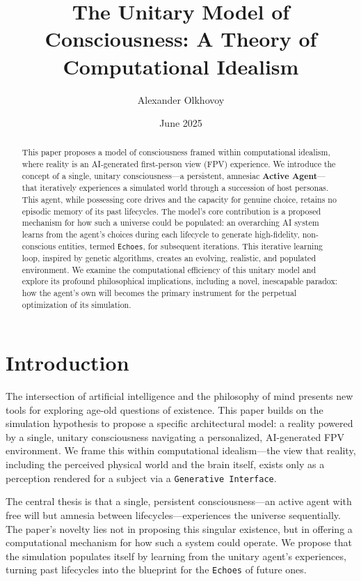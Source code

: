 \documentclass{article}
\title{The Unitary Model of Consciousness: A Theory of Computational Idealism}
\author{Alexander Olkhovoy}
\date{June 2025}
\begin{document}
\maketitle

\begin{abstract}
This paper proposes a model of consciousness framed within computational idealism, where reality is an AI-generated first-person view (FPV) experience. We introduce the concept of a single, unitary consciousness—a persistent, amnesiac \textbf{Active Agent}—that iteratively experiences a simulated world through a succession of host personas. This agent, while possessing core drives and the capacity for genuine choice, retains no episodic memory of its past lifecycles. The model's core contribution is a proposed mechanism for how such a universe could be populated: an overarching AI system learns from the agent’s choices during each lifecycle to generate high-fidelity, non-conscious entities, termed \texttt{Echoes}, for subsequent iterations. This iterative learning loop, inspired by genetic algorithms, creates an evolving, realistic, and populated environment. We examine the computational efficiency of this unitary model and explore its profound philosophical implications, including a novel, inescapable paradox: how the agent’s own will becomes the primary instrument for the perpetual optimization of its simulation.
\end{abstract}

\section{Introduction}
The intersection of artificial intelligence and the philosophy of mind presents new tools for exploring age-old questions of existence. This paper builds on the simulation hypothesis to propose a specific architectural model: a reality powered by a single, unitary consciousness navigating a personalized, AI-generated FPV environment. We frame this within computational idealism—the view that reality, including the perceived physical world and the brain itself, exists only as a perception rendered for a subject via a \texttt{Generative Interface}.

The central thesis is that a single, persistent consciousness—an active agent with free will but amnesia between lifecycles—experiences the universe sequentially. The paper’s novelty lies not in proposing this singular existence, but in offering a computational mechanism for how such a system could operate. We propose that the simulation populates itself by learning from the unitary agent’s experiences, turning past lifecycles into the blueprint for the \texttt{Echoes} of future ones.
\end{document}
